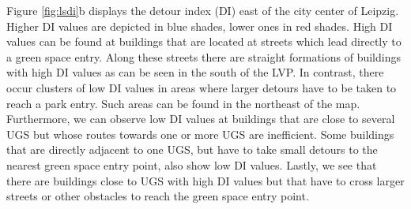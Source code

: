 \documentclass[10pt]{article}
\begin{document}
Figure \ref{fig:lsdi}b displays the detour index (DI) east of the city center of Leipzig.
Higher DI values are depicted in blue shades, lower ones in red shades.
High DI values can be found at buildings that are located at streets which lead directly to a green space entry. 
Along these streets there are straight formations of buildings with high DI values as can be seen in the south of the LVP. 
In contrast, there occur clusters of low DI values in areas where larger detours have to be taken to reach a park entry. Such areas can be found in the northeast of the map. 
Furthermore, we can observe low DI values at buildings that are close to several UGS but whose routes towards one or more UGS are inefficient.
Some buildings that are directly adjacent to one UGS, but have to take small detours to the nearest green space entry point, also show low DI values.
Lastly, we see that there are buildings close to UGS with high DI values but that have to cross larger streets or other obstacles to reach the green space entry point.
\end{document}
